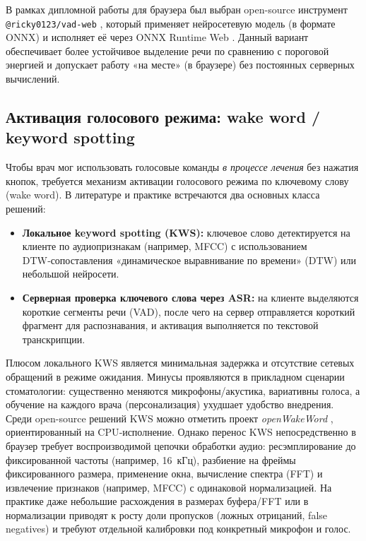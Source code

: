 В рамках дипломной работы для браузера был выбран open-source инструмент \texttt{@ricky0123/vad-web} \cite{RickyVADWeb}, который применяет нейросетевую модель (в формате ONNX) и исполняет её через ONNX Runtime Web \cite{ONNXRuntimeWeb}.
Данный вариант обеспечивает более устойчивое выделение речи по сравнению с пороговой энергией и допускает работу «на месте» (в браузере) без постоянных серверных вычислений.


\subsection{Активация голосового режима: wake word / keyword spotting}

Чтобы врач мог использовать голосовые команды \emph{в процессе лечения} без нажатия кнопок, требуется механизм активации голосового режима по ключевому слову (wake word).
В литературе и практике встречаются два основных класса решений:
\begin{itemize}
    \item \textbf{Локальное keyword spotting (KWS):} ключевое слово детектируется на клиенте по аудиопризнакам (например, MFCC) с использованием DTW‑сопоставления «динамическое выравнивание по времени» (DTW) или небольшой нейросети.
    \item \textbf{Серверная проверка ключевого слова через ASR:} на клиенте выделяются короткие сегменты речи (VAD), после чего на сервер отправляется короткий фрагмент для распознавания, и активация выполняется по текстовой транскрипции.
\end{itemize}

Плюсом локального KWS является минимальная задержка и отсутствие сетевых обращений в режиме ожидания.
Минусы проявляются в прикладном сценарии стоматологии: существенно меняются микрофоны/акустика, вариативны голоса, а обучение на каждого врача (персонализация) ухудшает удобство внедрения.
Среди open-source решений KWS можно отметить проект \textit{openWakeWord} \cite{OpenWakeWord}, ориентированный на CPU‑исполнение. Однако перенос KWS непосредственно в браузер требует воспроизводимой цепочки обработки аудио: ресэмплирование до фиксированной частоты (например, 16~кГц), разбиение на фреймы фиксированного размера, применение окна, вычисление спектра (FFT) и извлечение признаков (например, MFCC) с одинаковой нормализацией. На практике даже небольшие расхождения в размерах буфера/FFT или в нормализации приводят к росту доли пропусков (ложных отрицаний, false negatives) и требуют отдельной калибровки под конкретный микрофон и голос.

